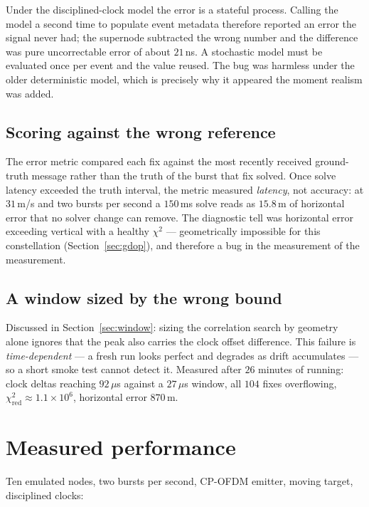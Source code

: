 \documentclass[11pt,a4paper]{article}
\begin{document}
Under the disciplined-clock model the error is a stateful process. Calling
the model a second time to populate event metadata therefore reported an
error the signal never had; the supernode subtracted the wrong number and
the difference was pure uncorrectable error of about $21$\,ns. A stochastic
model must be evaluated once per event and the value reused. The bug was
harmless under the older deterministic model, which is precisely why it
appeared the moment realism was added.

\subsection{Scoring against the wrong reference}

The error metric compared each fix against the most recently received
ground-truth message rather than the truth of the burst that fix solved.
Once solve latency exceeded the truth interval, the metric measured
\emph{latency}, not accuracy: at $31$\,m/s and two bursts per second a
$150$\,ms solve reads as $15.8$\,m of horizontal error that no solver change
can remove. The diagnostic tell was horizontal error exceeding vertical with
a healthy $\chi^2$ --- geometrically impossible for this constellation
(Section~\ref{sec:gdop}), and therefore a bug in the measurement of the
measurement.

\subsection{A window sized by the wrong bound}

Discussed in Section~\ref{sec:window}: sizing the correlation search by
geometry alone ignores that the peak also carries the clock offset
difference. This failure is \emph{time-dependent} --- a fresh run looks
perfect and degrades as drift accumulates --- so a short smoke test cannot
detect it. Measured after $26$ minutes of running: clock deltas reaching
$92\,\mu$s against a $27\,\mu$s window, all $104$ fixes overflowing,
$\chi^2_{\text{red}}\approx1.1\times10^{6}$, horizontal error $870$\,m.

\section{Measured performance}
\label{sec:measured}

Ten emulated nodes, two bursts per second, CP-OFDM emitter, moving target,
disciplined clocks:
\end{document}

